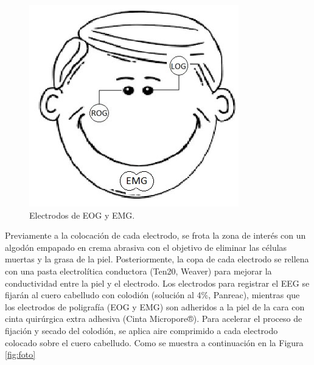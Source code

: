 \documentclass[letterpaper,titlepage,12pt,draft]{report}
\begin{document}
\begin{figure}[H]
\begin{center}
\includegraphics[scale=0.9]{cara1.jpg}
\caption{Electrodos de EOG y EMG.}
\label{fig:cara}
\end{center}
\end{figure}

Previamente a la colocaci\'on de cada electrodo, se frota la zona de inter\'es con un algod\'on empapado en crema abrasiva con el objetivo de eliminar las c\'elulas muertas y la grasa de la piel. Posteriormente, la copa de cada electrodo se rellena con una pasta electrol\'itica conductora (Ten20, Weaver) para mejorar la conductividad entre la piel y el electrodo. Los electrodos para registrar el EEG se fijar\'an al cuero cabelludo con colodi\'on (soluci\'on al 4\%, Panreac), mientras que los electrodos de poligraf\'ia (EOG y EMG) son adheridos a la piel de la cara con cinta quir\'urgica extra adhesiva (Cinta Micropore®). Para acelerar el proceso de fijaci\'on y secado del colodi\'on, se aplica aire comprimido a cada electrodo colocado sobre el cuero cabelludo. Como se muestra a continuaci\'on en la Figura \ref{fig:foto}\\
\end{document}
